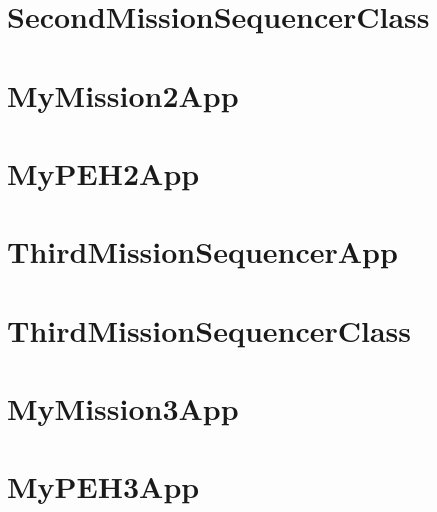 \documentclass{article}
\begin{document}
\section{SecondMissionSequencerClass}

\newpage

\section{MyMission2App}

\newpage

\section{MyPEH2App}

\newpage



\section{ThirdMissionSequencerApp}

\newpage

\section{ThirdMissionSequencerClass}

\newpage

\section{MyMission3App}

\newpage

\section{MyPEH3App}

\newpage
\end{document}
